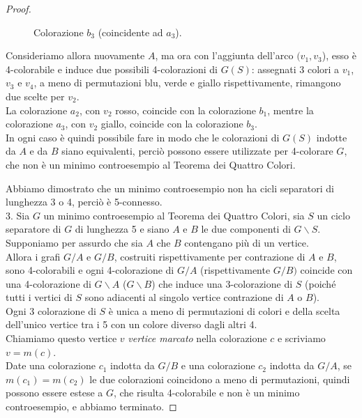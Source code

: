 \documentclass[a4paper,12pt,titlepage]{report}
\begin{document}
\begin{proof}
\begin{itemize}
\begin{figure}[H]
    			\caption{Colorazione $b_3$ (coincidente ad $a_3$).}
    			\end{figure}
    		Consideriamo allora nuovamente $A$, ma ora con l'aggiunta dell'arco $(v_1, v_3$), esso è 4-colorabile e induce due possibili 4-colorazioni di $G(S)$: assegnati 3 colori a $v_1$, $v_3$ e $v_4$, a meno di permutazioni blu, verde e giallo rispettivamente, rimangono due scelte per $v_2$.
    		\\La colorazione $a_2$, con $v_2$ rosso, coincide con la colorazione $b_1$, mentre la colorazione $a_3$, con $v_2$ giallo, coincide con la colorazione $b_3$.
    		\\In ogni caso è quindi possibile fare in modo che le colorazioni di $G(S)$ indotte da $A$ e da $B$ siano equivalenti, perciò possono essere utilizzate per 4-colorare $G$, che non è un minimo controesempio al Teorema dei Quattro Colori. 
    	\end{itemize}
    	Abbiamo dimostrato che un minimo controesempio non ha cicli separatori di lunghezza 3 o 4, perciò è 5-connesso.
    	\vspace{0.5cm}
    	\\3. Sia $G$ un minimo controesempio al Teorema dei Quattro Colori, sia $S$ un ciclo separatore di $G$ di lunghezza 5 e siano $A$ e $B$ le due componenti di $G \smallsetminus S$.
    	\\Supponiamo per assurdo che sia $A$ che $B$ contengano più di un vertice.
    	\\Allora i grafi $G/A$ e $G/B$, costruiti rispettivamente per contrazione di $A$ e $B$, sono 4-colorabili e ogni 4-colorazione di $G/A$ (rispettivamente $G/B)$ coincide con una 4-colorazione di $G \smallsetminus A$ ($G \smallsetminus B$) che induce una 3-colorazione di $S$ (poiché tutti i vertici di $S$ sono adiacenti al singolo vertice contrazione di $A$ o $B$).
    	\\Ogni 3 colorazione di $S$ è unica a meno di permutazioni di colori e della scelta dell'unico vertice tra i 5 con un colore diverso dagli altri 4.
    	\\Chiamiamo questo vertice $v$ \emph{vertice marcato} nella colorazione $c$ e scriviamo $v = m(c)$.
    	\\Date una colorazione $c_1$ indotta da $G/B$ e una colorazione $c_2$ indotta da $G/A$, se $m(c_1) = m(c_2)$ le due colorazioni coincidono a meno di permutazioni, quindi possono essere estese a $G$, che risulta 4-colorabile e non è un minimo controesempio, e abbiamo terminato.

\end{proof}
\end{document}
